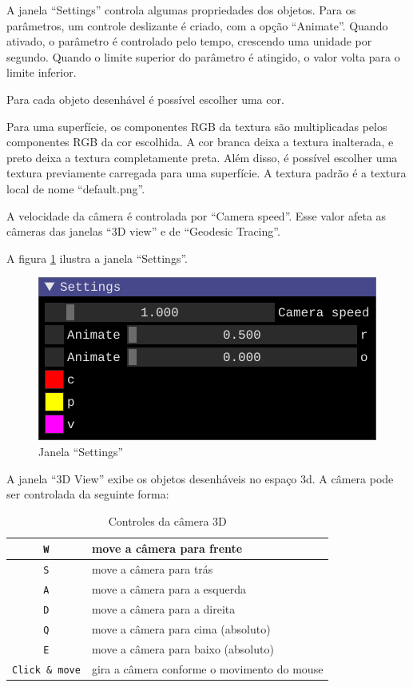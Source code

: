 A janela ``Settings'' controla algumas propriedades dos objetos.
Para os parâmetros, um controle deslizante é criado, com a opção ``Animate''.
Quando ativado, o parâmetro é controlado pelo tempo,
crescendo uma unidade por segundo.
Quando o limite superior do parâmetro é atingido,
o valor volta para o limite inferior.

Para cada objeto desenhável é possível escolher uma cor.

Para uma superfície, os componentes RGB da textura
são multiplicadas pelos componentes RGB da cor escolhida.
A cor branca deixa a textura inalterada,
e preto deixa a textura completamente preta.
Além disso, é possível escolher uma textura previamente carregada para
uma superfície. A textura padrão é a textura local de nome ``default.png''.

A velocidade da câmera é controlada por ``Camera speed''.
Esse valor afeta as câmeras das janelas ``3D view'' e de ``Geodesic Tracing''.

A figura \ref{img:settings} ilustra a janela ``Settings''.

\begin{figure}[!ht]
    \includegraphics[width=\linewidth]{settings.png}
    \caption{Janela ``Settings''}
    \label{img:settings}
\end{figure}

A janela ``3D View'' exibe os objetos desenháveis no espaço 3d.
A câmera pode ser controlada da seguinte forma:

\begin{table}[ht]
\caption{Controles da câmera 3D}
\label{camctrl}
\begin{centering}
\begin{tabularx}{\textwidth}{||c|X||}
    \hline
    \texttt{W} & move a câmera para frente \\
    \hline
    \texttt{S} & move a câmera para trás \\
    \hline
    \texttt{A} & move a câmera para a esquerda \\
    \hline
    \texttt{D} & move a câmera para a direita \\
    \hline
    \texttt{Q} & move a câmera para cima (absoluto) \\
    \hline
    \texttt{E} & move a câmera para baixo (absoluto) \\
    \hline
    \texttt{Click \& move} & gira a câmera conforme o movimento do mouse \\
    \hline
\end{tabularx}
\end{centering}
\end{table}

